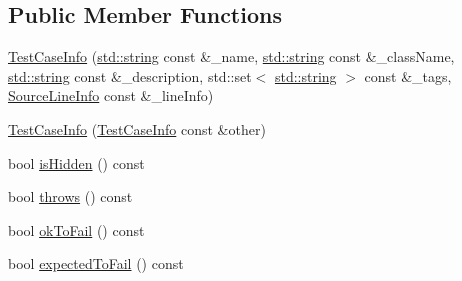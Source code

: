 \subsection*{Public Member Functions}
\begin{DoxyCompactItemize}
\item 
\hyperlink{struct_catch_1_1_test_case_info_a35ec65315e0d1f178491b5a59f3f3123}{Test\+Case\+Info} (\hyperlink{_s_d_l__opengl__glext_8h_ae84541b4f3d8e1ea24ec0f466a8c568b}{std\+::string} const \&\+\_\+name, \hyperlink{_s_d_l__opengl__glext_8h_ae84541b4f3d8e1ea24ec0f466a8c568b}{std\+::string} const \&\+\_\+class\+Name, \hyperlink{_s_d_l__opengl__glext_8h_ae84541b4f3d8e1ea24ec0f466a8c568b}{std\+::string} const \&\+\_\+description, std\+::set$<$ \hyperlink{_s_d_l__opengl__glext_8h_ae84541b4f3d8e1ea24ec0f466a8c568b}{std\+::string} $>$ const \&\+\_\+tags, \hyperlink{struct_catch_1_1_source_line_info}{Source\+Line\+Info} const \&\+\_\+line\+Info)
\item 
\hyperlink{struct_catch_1_1_test_case_info_ac338adb4e38f4bf3977fb45b2b1fe447}{Test\+Case\+Info} (\hyperlink{struct_catch_1_1_test_case_info}{Test\+Case\+Info} const \&other)
\item 
bool \hyperlink{struct_catch_1_1_test_case_info_a01ac8b11d8c105e5278a239ab5214257}{is\+Hidden} () const 
\item 
bool \hyperlink{struct_catch_1_1_test_case_info_a19fb4f0b755956eee8a1fecf713fb7ca}{throws} () const 
\item 
bool \hyperlink{struct_catch_1_1_test_case_info_a64586336bb49bd6e9ef8a089b072a712}{ok\+To\+Fail} () const 
\item 
bool \hyperlink{struct_catch_1_1_test_case_info_a1ed1c3689c2874c421466945bd3cb75c}{expected\+To\+Fail} () const 
\end{DoxyCompactItemize}
